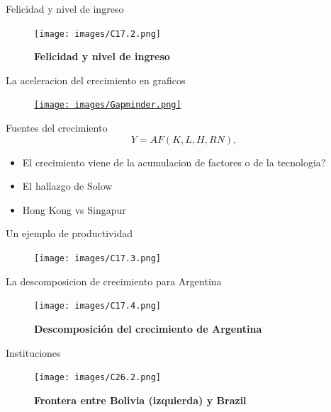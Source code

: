 \documentclass{beamer}
\begin{document}
\begin{frame}{Felicidad y nivel de ingreso}
    \begin{figure} [H]   \texttt{[image: images/C17.2.png]}
\caption{\textbf{Felicidad y nivel de ingreso}}
\label{fig:26.2}
\end{figure}
\end{frame}


\begin{frame}{La aceleracion del crecimiento en graficos}
    \begin{figure}[htp]
\href{https://www.gapminder.org/tools/} {\texttt{[image: images/Gapminder.png]}} 
\end{figure}
\end{frame}




\begin{frame}{Fuentes del crecimiento}
   \begin{equation}
    Y = AF(K,L,H,RN),
\end{equation} 
\begin{itemize}
    \item El crecimiento viene de la acumulacion de factores o de la tecnologia?
    \item El hallazgo de Solow
    \item Hong Kong vs Singapur
\end{itemize}
\end{frame}

\begin{frame}{Un ejemplo de productividad}
    \begin{figure} [H]   \texttt{[image: images/C17.3.png]}
\label{fig:17.3}
\end{figure}
\end{frame}


\begin{frame}{La descomposicion de crecimiento para Argentina}
    \begin{figure} [H]   \texttt{[image: images/C17.4.png]}
\caption{\textbf{Descomposición del crecimiento de Argentina}}
\label{fig:26.4}
\end{figure}
\end{frame}



\begin{frame}{Instituciones}
    
\begin{figure}[H]
\begin{center}
\texttt{[image: images/C26.2.png]}
\end{center}
\caption{\textbf{Frontera entre Bolivia (izquierda) y Brazil}}
\label{fig:border_bol_bra}
\end{figure}
\end{frame}
\end{document}
